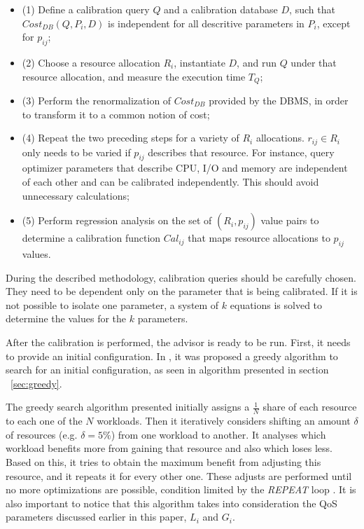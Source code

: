 \begin{itemize}
 \item (1) Define a calibration query $Q$ and a calibration database $D$, such that $Cost_{DB}(Q,P_{i},D)$ is independent for all descritive parameters in $P_{i}$, except for $p_{ij}$; \\
  \item (2) Choose a resource allocation $R_{i}$, instantiate $D$, and run $Q$ under that resource allocation, and measure the execution time $T_{Q}$; \\
  \item (3) Perform the renormalization of $Cost_{DB}$ provided by the DBMS, in order to transform it to a common notion of cost; \\
  \item (4) Repeat the two preceding steps for a variety of $R_{i}$ allocations. $r_{ij} \in R_{i}$ only needs to be varied if $p_{ij}$ describes that resource. For instance, query optimizer parameters that describe CPU, I/O and memory are independent of each other and can be calibrated independently. This should avoid unnecessary calculations; \\
  \item (5) Perform regression analysis on the set of $(R_{i},p_{ij})$ value pairs to determine a calibration function $Cal_{ij}$ that maps resource allocations to $p_{ij}$ values. \\
\end{itemize}

During the described methodology, calibration queries should be carefully chosen. They need to be dependent only on the parameter that is being calibrated. If it is not possible to isolate one parameter, a system of $k$ equations is solved to determine the values for the $k$ parameters.

After the calibration is performed, the advisor is ready to be run. First, it needs to provide an initial configuration. In \cite{Soror:2008:AVM:1376616.1376711}, it was proposed a greedy algorithm to search for an initial configuration, as seen in algorithm presented in section ~\ref{sec:greedy}.


The greedy search algorithm presented initially assigns a $\frac{1}{N}$ share of each resource to each one of the $N$ workloads. Then it iteratively considers shifting an amount $\delta$ of resources (e.g. $\delta = 5\%$) from one workload to another. It analyses which workload benefits more from gaining that resource and also which loses less. Based on this, it tries to obtain the maximum benefit from adjusting this resource, and it repeats it for every other one. These adjusts are performed until no more optimizations are possible, condition limited by the \textit{REPEAT} loop . It is also important to notice that this algorithm takes into consideration the QoS parameters discussed earlier in this paper, $L_{i}$ and $G_{i}$.

